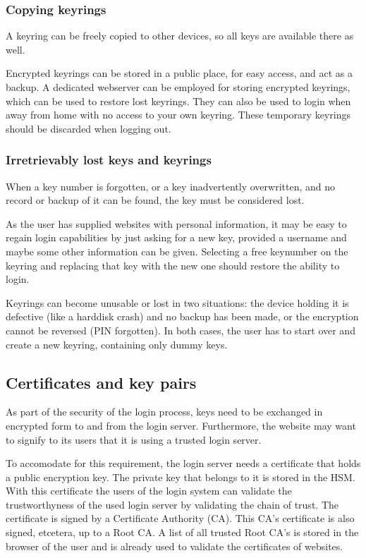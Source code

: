 \subsubsection{Copying keyrings}
A keyring can be freely copied to other devices, so all keys are available there as well.
\par
Encrypted keyrings can be stored in a public place, for easy access, and act as a backup.
A dedicated webserver can be employed for storing encrypted keyrings,
which can be used to restore lost keyrings.
They can also be used to login when away from home with no access to your own keyring.
These temporary keyrings should be discarded when logging out.

\subsubsection{Irretrievably lost keys and keyrings}
When a key number is forgotten,
or a key inadvertently overwritten,
and no record or backup of it can be found,
the key must be considered lost.
\par
As the user has supplied websites with personal information,
it may be easy to regain login capabilities by just asking for a new key,
provided a username and maybe some other information can be given.
Selecting a free keynumber on the keyring and replacing that key with the new one should restore the ability to login.
\par
Keyrings can become unusable or lost in two situations:
the device holding it is defective
(like a harddisk crash)
and no backup has been made,
or the encryption cannot be reversed
(PIN forgotten).
In both cases,
the user has to start over and create a new keyring,
containing only dummy keys.

\subsection{Certificates and key pairs}
As part of the security of the login process,
keys need to be exchanged in encrypted form to and from the login server.
Furthermore,
the website may want to signify to its users that it is using a trusted login server.
\par
To accomodate for this requirement, the login server needs a certificate that holds a public encryption key.
The private key that belongs to it is stored in the HSM.
With this certificate the users of the login system can validate the trustworthyness of the used login server
by validating the chain of trust.
The certificate is signed by a Certificate Authority (CA).
This CA's certificate is also signed, etcetera, up to a Root CA.
A list of all trusted Root CA's is stored in the browser of the user
and is already used to validate the certificates of websites.
